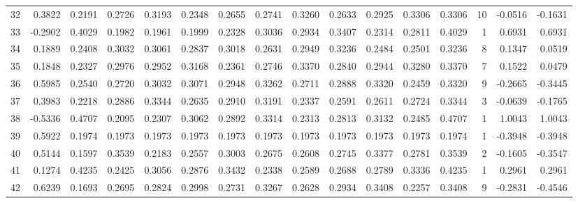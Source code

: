 \begin{tabular}{lrrrrrrrrrrrrrrr}
32  &      0.3822 &  0.2191 &  0.2726 &  0.3193 &  0.2348 &  0.2655 &  0.2741 &  0.3260 &  0.2633 &  0.2925 &   0.3306 &     0.3306 &     10 &                   -0.0516 &                    -0.1631 \\
33  &     -0.2902 &  0.4029 &  0.1982 &  0.1961 &  0.1999 &  0.2328 &  0.3036 &  0.2934 &  0.3407 &  0.2314 &   0.2811 &     0.4029 &      1 &                    0.6931 &                     0.6931 \\
34  &      0.1889 &  0.2408 &  0.3032 &  0.3061 &  0.2837 &  0.3018 &  0.2631 &  0.2949 &  0.3236 &  0.2484 &   0.2501 &     0.3236 &      8 &                    0.1347 &                     0.0519 \\
35  &      0.1848 &  0.2327 &  0.2976 &  0.2952 &  0.3168 &  0.2361 &  0.2746 &  0.3370 &  0.2840 &  0.2944 &   0.3280 &     0.3370 &      7 &                    0.1522 &                     0.0479 \\
36  &      0.5985 &  0.2540 &  0.2720 &  0.3032 &  0.3071 &  0.2948 &  0.3262 &  0.2711 &  0.2888 &  0.3320 &   0.2459 &     0.3320 &      9 &                   -0.2665 &                    -0.3445 \\
37  &      0.3983 &  0.2218 &  0.2886 &  0.3344 &  0.2635 &  0.2910 &  0.3191 &  0.2337 &  0.2591 &  0.2611 &   0.2724 &     0.3344 &      3 &                   -0.0639 &                    -0.1765 \\
38  &     -0.5336 &  0.4707 &  0.2095 &  0.2307 &  0.3062 &  0.2892 &  0.3314 &  0.2313 &  0.2813 &  0.3132 &   0.2485 &     0.4707 &      1 &                    1.0043 &                     1.0043 \\
39  &      0.5922 &  0.1974 &  0.1973 &  0.1973 &  0.1973 &  0.1973 &  0.1973 &  0.1973 &  0.1973 &  0.1973 &   0.1973 &     0.1974 &      1 &                   -0.3948 &                    -0.3948 \\
40  &      0.5144 &  0.1597 &  0.3539 &  0.2183 &  0.2557 &  0.3003 &  0.2675 &  0.2608 &  0.2745 &  0.3377 &   0.2781 &     0.3539 &      2 &                   -0.1605 &                    -0.3547 \\
41  &      0.1274 &  0.4235 &  0.2425 &  0.3056 &  0.2876 &  0.3432 &  0.2338 &  0.2589 &  0.2688 &  0.2789 &   0.3336 &     0.4235 &      1 &                    0.2961 &                     0.2961 \\
42  &      0.6239 &  0.1693 &  0.2695 &  0.2824 &  0.2998 &  0.2731 &  0.3267 &  0.2628 &  0.2934 &  0.3408 &   0.2257 &     0.3408 &      9 &                   -0.2831 &                    -0.4546 \\

\end{tabular}

